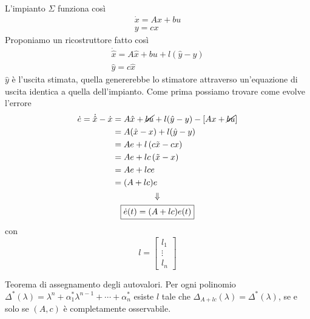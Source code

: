 \documentclass[10pt,a4paper]{book}
\begin{document}
\begin{figure}[htpb]
\end{figure}\FloatBarrier

L'impianto $\Sigma $ funziona così
\begin{gather*}
\dot{x} =Ax+bu\\
y=cx
\end{gather*}
Proponiamo un ricostruttore fatto così
\begin{gather*}
\boxed{\dot{\hat{x}} =A\hat{x} +bu+l(\hat{y} -y)}\\
\hat{y} =c\hat{x}
\end{gather*}
$\hat{y}$ è l'uscita stimata, quella genererebbe lo stimatore attraverso un'equazione di uscita identica a quella dell'impianto. Come prima possiamo trovare come evolve l'errore
\begin{gather*}
\begin{aligned}
\dot{e} =\dot{\hat{x}} -\dot{x} & =A\hat{x} +\cancel{bu} +l(\hat{y} -y) -\left[ Ax+\cancel{bu}\right]\\
 & =A(\hat{x} -x) +l(\hat{y} -y)\\
 & =Ae+l\left( c\tilde{x} -cx\right)\\
 & =Ae+lc\left(\tilde{x} -x\right)\\
 & =Ae+lce\\
 & =( A+lc) e
\end{aligned}\\
\Downarrow \\
\boxed{\dot{e}(t) =( A+lc) e(t)}
\end{gather*}
con
\begin{equation*}
l=\begin{bmatrix}
l_1\\
\vdots \\
l_n
\end{bmatrix}
\end{equation*}
\begin{theorem}
Teorema di assegnamento degli autovalori. Per ogni polinomio $\Delta ^{*}( \lambda ) =\lambda ^n +\alpha ^{*}_1 \lambda ^{n-1} +\cdots +\alpha ^{*}_n$ esiste $l$ tale che $\Delta _{A+lc}( \lambda ) =\Delta ^{*}( \lambda )$, se e solo se $( A,c)$ è completamente osservabile.
\end{theorem}
\end{document}

